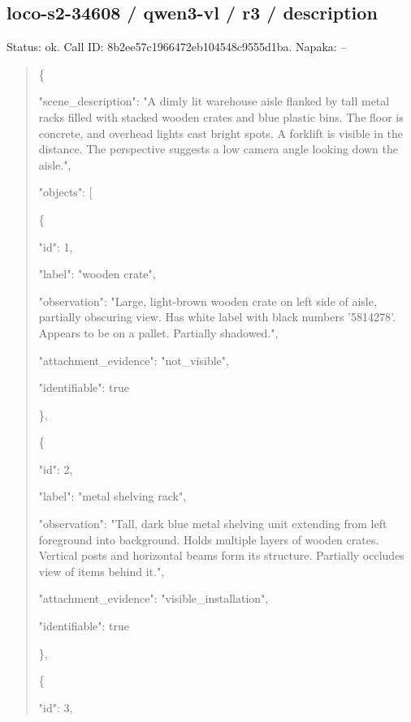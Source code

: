 \documentclass[10pt,a4paper]{article}
\begin{document}
\subsection*{loco-s2-34608 / qwen3-vl / r3 / description}
Status: ok. Call ID: 8b2ee57c1966472eb104548c9555d1ba. Napaka: --
\begin{quote}\footnotesize
\{\par
  "scene\_description":\allowbreak{} "A dimly lit warehouse aisle flanked by tall metal racks filled with stacked wooden crates and blue plastic bins. The floor is concrete,\allowbreak{} and overhead lights cast bright spots. A forklift is visible in the distance. The perspective suggests a low camera angle looking down the aisle.",\allowbreak{}\par
  "objects":\allowbreak{} [\par
    \{\par
      "id":\allowbreak{} 1,\allowbreak{}\par
      "label":\allowbreak{} "wooden crate",\allowbreak{}\par
      "observation":\allowbreak{} "Large,\allowbreak{} light-brown wooden crate on left side of aisle,\allowbreak{} partially obscuring view. Has white label with black numbers '5814278'. Appears to be on a pallet. Partially shadowed.",\allowbreak{}\par
      "attachment\_evidence":\allowbreak{} "not\_visible",\allowbreak{}\par
      "identifiable":\allowbreak{} true\par
    \},\allowbreak{}\par
    \{\par
      "id":\allowbreak{} 2,\allowbreak{}\par
      "label":\allowbreak{} "metal shelving rack",\allowbreak{}\par
      "observation":\allowbreak{} "Tall,\allowbreak{} dark blue metal shelving unit extending from left foreground into background. Holds multiple layers of wooden crates. Vertical posts and horizontal beams form its structure. Partially occludes view of items behind it.",\allowbreak{}\par
      "attachment\_evidence":\allowbreak{} "visible\_installation",\allowbreak{}\par
      "identifiable":\allowbreak{} true\par
    \},\allowbreak{}\par
    \{\par
      "id":\allowbreak{} 3,\allowbreak{}\par

\end{quote}
\end{document}
